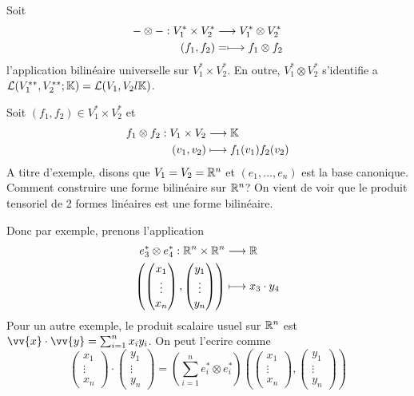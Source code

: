 Soit
\begin{align*}
  -\otimes -: V_1^* \times V_2^* &\longrightarrow V_1^*\otimes V_2^* \\
  (f_1, f_2)&=\longmapsto f_1\otimes f_2
\end{align*}
l'application bilinéaire universelle sur $V_1^* \times V_2^*$. En outre, $V_1^* \otimes V_2^*$ s'identifie a $\mathcal{L}(V_1^{**}, V_2^{**}; \mathbb{K}) = \mathcal{L}(V_1, V_2l \mathbb{K})$.
\par Soit $(f_1,f_2) \in V_1^* \times V_2^*$ et
\begin{align*}
  f_1\otimes f_2: V_1\times V_2 &\longrightarrow \mathbb{K} \\
  (v_1,v_2)&\longmapsto f_1(v_1)f_2(v_2)
\end{align*}
A titre d'exemple, disons que $V_1=V_2=\mathbb{R}^n$ et $(e_1, \dots, e_n)$ est la base canonique. Comment construire une forme bilinéaire sur $\mathbb{R}^n$? On vient de voir que le produit tensoriel de 2 formes linéaires est une forme bilinéaire.
\par Donc par exemple, prenons l'application
\begin{align*}
  e_3^* \otimes e_4^*: \mathbb{R}^n \times \mathbb{R}^n &\longrightarrow \mathbb{R} \\
  \left( \begin{pmatrix} x_1 \\ \vdots \\ x_n \end{pmatrix}, \begin{pmatrix} y_1 \\ \vdots \\ y_n \end{pmatrix}  \right)&\longmapsto x_3\cdot y_4
\end{align*}
Pour un autre exemple, le produit scalaire usuel sur $\mathbb{R}^n$ est $\vv{x}\cdot \vv{y} = \sum_{i=1}^n x_iy_i$. On peut l'ecrire comme
$$\begin{pmatrix} x_1 \\ \vdots \\ x_n \end{pmatrix} \cdot \begin{pmatrix} y_1 \\ \vdots \\ y_n \end{pmatrix} = \left( \sum_{i=1}^n e_i^* \otimes e_i^* \right)\left( \begin{pmatrix} x_1 \\ \vdots \\ x_n \end{pmatrix} , \begin{pmatrix} y_1 \\ \vdots \\ y_n \end{pmatrix}  \right) $$ 

